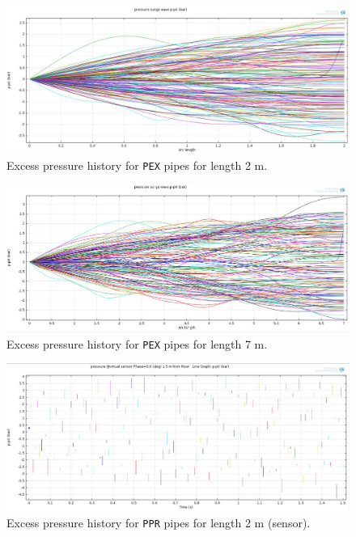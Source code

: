 \begin{figure}[htbp]
\hspace*{-0.1\textwidth}\includegraphics[width=1.2\textwidth]{./water-hammer/PEX/PEX-2}
\caption{Excess pressure history for \texttt{PEX} pipes for length 2 m.}
\label{pex3}
\end{figure}

\begin{figure}[htbp]
\hspace*{-0.1\textwidth}\includegraphics[width=1.2\textwidth]{./water-hammer/PEX/PEX-7}
\caption{Excess pressure history for \texttt{PEX} pipes for length 7 m.}
\label{pex4}
\end{figure}


\begin{figure}[htbp]
\hspace*{-0.1\textwidth}\includegraphics[width=1.2\textwidth]{./water-hammer/PPR/PPR-2-sensor}
\caption{Excess pressure history for \texttt{PPR} pipes for length 2 m (sensor).}
\label{ppr1}
\end{figure}

